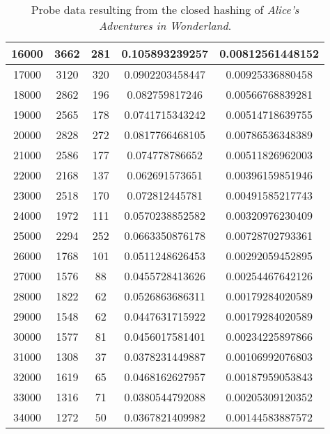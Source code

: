\begin{table}[H]
\begin{tabular}{|c|c|c|c|c|}
		16000   & 3662         & 281          &  0.105893239257         & 0.00812561448152 \\ \hline
		17000   & 3120         & 320          &  0.0902203458447        & 0.00925336880458 \\ \hline
		18000   & 2862         & 196          &  0.082759817246         & 0.00566768839281 \\ \hline
		19000   & 2565         & 178          &  0.0741715343242        & 0.00514718639755 \\ \hline
		20000   & 2828         & 272          &  0.0817766468105        & 0.00786536348389 \\ \hline
		21000   & 2586         & 177          &  0.074778786652         & 0.00511826962003 \\ \hline
		22000   & 2168         & 137          &  0.062691573651         & 0.00396159851946 \\ \hline
		23000   & 2518         & 170          &  0.072812445781         & 0.00491585217743 \\ \hline
		24000   & 1972         & 111          &  0.0570238852582        & 0.00320976230409 \\ \hline
		25000   & 2294         & 252          &  0.0663350876178        & 0.00728702793361 \\ \hline
		26000   & 1768         & 101          &  0.0511248626453        & 0.00292059452895 \\ \hline
		27000   & 1576         & 88           &  0.0455728413626        & 0.00254467642126 \\ \hline
		28000   & 1822         & 62           &  0.0526863686311        & 0.00179284020589 \\ \hline
		29000   & 1548         & 62           &  0.0447631715922        & 0.00179284020589 \\ \hline
		30000   & 1577         & 81           &  0.0456017581401        & 0.00234225897866 \\ \hline
		31000   & 1308         & 37           &  0.0378231449887        & 0.00106992076803 \\ \hline
		32000   & 1619         & 65           &  0.0468162627957        & 0.00187959053843 \\ \hline
		33000   & 1316         & 71           &  0.0380544792088        & 0.00205309120352 \\ \hline
		34000   & 1272         & 50           &  0.0367821409982        & 0.00144583887572 \\ \hline
	\end{tabular}
	\parbox{.55\textwidth}{\caption{Probe data resulting from the closed hashing of \emph{Alice's Adventures in Wonderland}.}
	\label{tab:closedData}}
\end{table}
